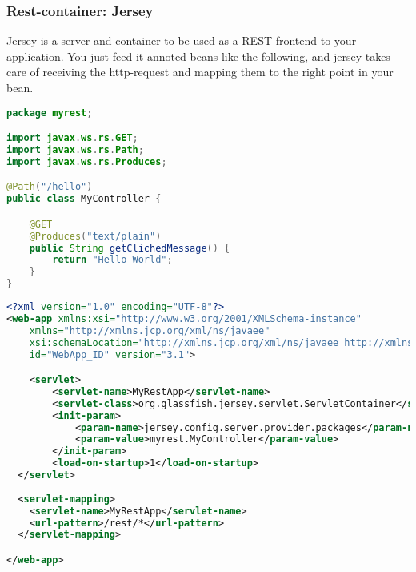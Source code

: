 \subsubsection{Rest-container: Jersey}

Jersey is a server and container to be used as a REST-frontend to your application. You just feed it annoted beans like the following, and jersey takes care of receiving the http-request and mapping them to the right point in your bean.

\begin{lstlisting}[language=java,title=MyController.java]
package myrest;

import javax.ws.rs.GET;
import javax.ws.rs.Path;
import javax.ws.rs.Produces;

@Path("/hello")
public class MyController {

	@GET
	@Produces("text/plain")
	public String getClichedMessage() {
		return "Hello World";
	}
}
\end{lstlisting}

\begin{lstlisting}[language=xml,title=web.xml]
<?xml version="1.0" encoding="UTF-8"?>
<web-app xmlns:xsi="http://www.w3.org/2001/XMLSchema-instance"
	xmlns="http://xmlns.jcp.org/xml/ns/javaee"
	xsi:schemaLocation="http://xmlns.jcp.org/xml/ns/javaee http://xmlns.jcp.org/xml/ns/javaee/web-app_3_1.xsd"
	id="WebApp_ID" version="3.1">

	<servlet>
	    <servlet-name>MyRestApp</servlet-name>
	    <servlet-class>org.glassfish.jersey.servlet.ServletContainer</servlet-class>
	    <init-param>
	        <param-name>jersey.config.server.provider.packages</param-name>
	        <param-value>myrest.MyController</param-value>
	    </init-param>
    	<load-on-startup>1</load-on-startup>
  </servlet>
  
  <servlet-mapping>
    <servlet-name>MyRestApp</servlet-name>
    <url-pattern>/rest/*</url-pattern>
  </servlet-mapping>

</web-app>
\end{lstlisting}


